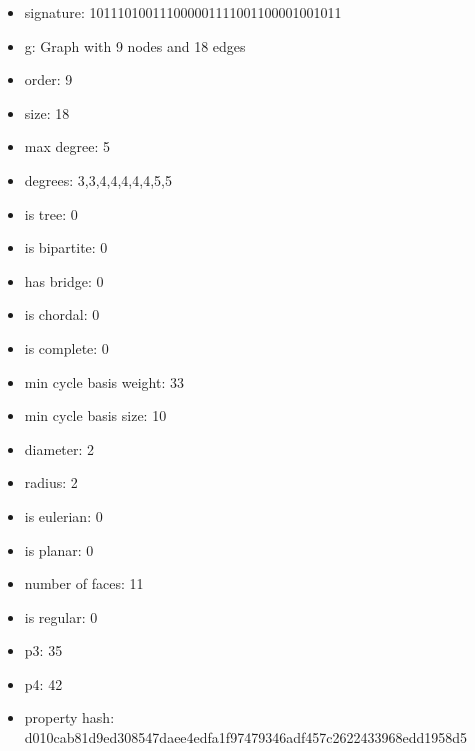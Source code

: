 \newpage
\begin{figure}
\end{figure}
\begin{itemize}
\item signature: 101110100111000001111001100001001011
\item g: Graph with 9 nodes and 18 edges
\item order: 9
\item size: 18
\item max degree: 5
\item degrees: 3,3,4,4,4,4,4,5,5
\item is tree: 0
\item is bipartite: 0
\item has bridge: 0
\item is chordal: 0
\item is complete: 0
\item min cycle basis weight: 33
\item min cycle basis size: 10
\item diameter: 2
\item radius: 2
\item is eulerian: 0
\item is planar: 0
\item number of faces: 11
\item is regular: 0
\item p3: 35
\item p4: 42
\item property hash: d010cab81d9ed308547daee4edfa1f97479346adf457c2622433968edd1958d5
\end{itemize}
